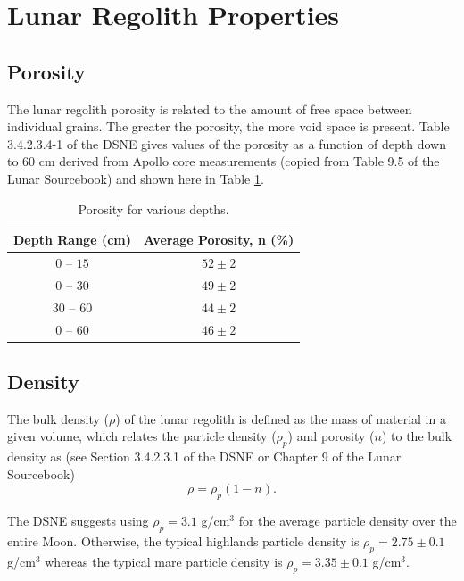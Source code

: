 \documentclass{article}
\begin{document}
\section{Lunar Regolith Properties}

\subsection{Porosity}

The lunar regolith porosity is related to the amount of free space between individual grains. The greater the porosity, the more void space is present. Table 3.4.2.3.4-1 of the DSNE gives values of the porosity as a function of depth down to $60$ cm derived from Apollo core measurements (copied from Table 9.5 of the Lunar Sourcebook) and shown here in Table \ref{tab:porosity}.


\begin{table}[h!]
	\begin{center}
		\caption{Porosity for various depths.}
		\label{tab:porosity}
		\begin{tabular}{c c}
			\hline
			Depth Range (cm)  & Average Porosity, n (\%)  \\
			\hline
			$0$ -- $15$  & $52\pm 2$  \\
			$0$ -- $30$  & $49\pm 2$   \\
			$30$ -- $60$ & $44\pm 2$   \\
			$0$ -- $60$  & $46\pm 2$  \\\hline
		\end{tabular}
	\end{center}
\end{table}


\subsection{Density}

The bulk density ($\rho$) of the lunar regolith is defined as the mass of material in a given volume, which relates the particle density ($\rho_p$) and porosity ($n$) to the bulk density as (see Section 3.4.2.3.1 of the DSNE or Chapter 9 of the Lunar Sourcebook)
\begin{equation}
\rho = \rho_p(1-n).
\end{equation}

The DSNE suggests using $\rho_p = 3.1$ g/cm$^3$ for the average particle density over the entire Moon. Otherwise, the typical highlands particle density is $\rho_p = 2.75\pm 0.1$ g/cm$^3$ whereas the typical mare particle density is $\rho_p = 3.35\pm 0.1$ g/cm$^3$.
\end{document}
